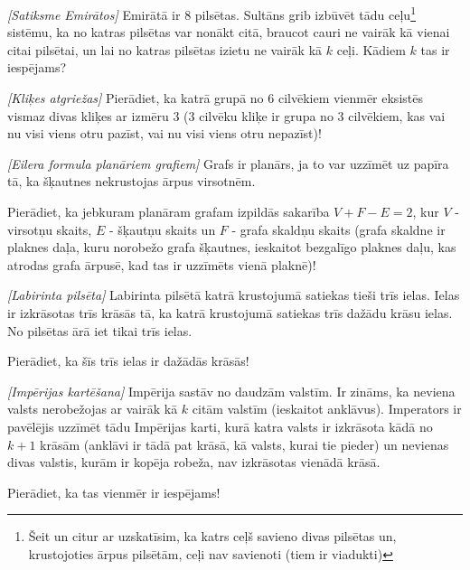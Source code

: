 

%



\noindent 


\begin{problem}
\textit{[Satiksme Emirātos]}
Emirātā ir $8$ pilsētas. Sultāns grib izbūvēt tādu ceļu\footnote{Šeit un citur ar uzskatīsim, ka katrs ceļš savieno divas pilsētas un, krustojoties ārpus pilsētām, ceļi nav savienoti (tiem ir viadukti)} sistēmu, ka no katras pilsētas var nonākt citā, braucot cauri ne vairāk kā vienai citai pilsētai, un lai no katras pilsētas izietu ne vairāk kā $k$ ceļi. Kādiem $k$ tas ir iespējams?

\end{problem}
%

\begin{problem}
\textit{[Kliķes atgriežas]}
Pierādiet, ka katrā grupā no $6$ cilvēkiem vienmēr eksistēs vismaz divas kliķes ar izmēru $3$ ($3$ cilvēku kliķe ir grupa no $3$ cilvēkiem, kas vai nu visi viens otru pazīst, vai nu visi viens otru nepazīst)!
\end{problem}
%

\begin{problem}
\textit{[Eilera formula planāriem grafiem]}
Grafs ir planārs, ja to var uzzīmēt uz papīra tā, ka šķautnes nekrustojas ārpus virsotnēm. 

Pierādiet, ka jebkuram planāram grafam izpildās sakarība $V+F-E=2$, kur $V$ - virsotņu skaits, $E$ - šķautņu skaits un $F$ - grafa skaldņu skaits (grafa skaldne ir plaknes daļa, kuru norobežo grafa šķautnes, ieskaitot bezgalīgo plaknes daļu, kas atrodas grafa ārpusē, kad tas ir uzzīmēts vienā plaknē)!
\end{problem}


\begin{problem}
\textit{[Labirinta pilsēta]}
Labirinta pilsētā katrā krustojumā satiekas tieši trīs ielas. Ielas ir izkrāsotas trīs krāsās tā, ka katrā krustojumā satiekas trīs dažādu krāsu ielas. No pilsētas ārā iet tikai trīs ielas. 

Pierādiet, ka šīs trīs ielas ir dažādās krāsās!
\end{problem}
%

\begin{problem}
\textit{[Impērijas kartēšana]}
Impērija sastāv no daudzām valstīm. Ir zināms, ka neviena valsts nerobežojas ar vairāk kā $k$ citām valstīm (ieskaitot anklāvus). Imperators ir pavēlējis uzzīmēt tādu Impērijas karti, kurā katra valsts ir izkrāsota kādā no $k+1$ krāsām (anklāvi ir tādā pat krāsā, kā valsts, kurai tie pieder) un nevienas divas valstis, kurām ir kopēja robeža, nav izkrāsotas vienādā krāsā. 

Pierādiet, ka tas vienmēr ir iespējams!

\end{problem}
%


